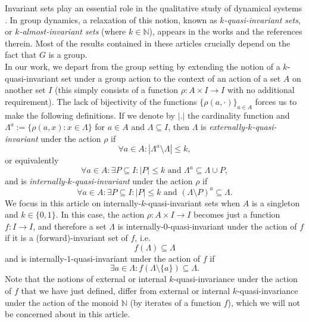 \documentclass[a4paper,11pt]{article}
\theoremstyle{plain}
\theoremstyle{definition}
\theoremstyle{remark}
\begin{document}
Invariant sets play an essential role in the qualitative study of dynamical systems \cite{KatokHasselblatt,BrinStuck}. In group dynamics, a relaxation of this notion, known as \textit{$k$-quasi-invariant sets}, or \textit{$k$-almost-invariant sets} (where $k \in \mathbb{N}$), appears in the works \cite{Brailovsky, Praeger, BrailovskyPasechenikPraeger, Kharazishvili, KimKim, AlaeiyanYoshiara, AlaeiyanRazzaghmanieshi} and the references therein. Most of the results contained in these articles crucially depend on the fact that $G$ is a group. \\
In our work, we depart from the group setting by extending the notion of a $k$-quasi-invariant set under a group action to the context of an action of a set $A$ on another set $I$ (this simply consists of a function $\rho : A \times I \to I$ with no additional requirement). The lack of bijectivity of the functions $\{\rho(a,\cdot)\}_{a \in A}$ forces us to make the following definitions. If we denote by $|.|$ the cardinality function and $\Lambda^a := \{\rho(a,x) : x \in \Lambda\}$ for $a \in A$ and $\Lambda \subseteq I$, then $\Lambda$ is \textit{externally-$k$-quasi-invariant} under the action $\rho$ if
\[ \forall a \in A : |\Lambda^a \setminus \Lambda| \leq k, \] 
or equivalently
\[ \forall a \in A : \exists P \subseteq I : |P| \leq k \text{ and } \Lambda^a \subseteq \Lambda \cup P, \] 
and is \textit{internally-$k$-quasi-invariant} under the action $\rho$ if
\[ \forall a \in A : \exists P \subseteq I : |P| \leq k \text{ and } (\Lambda \setminus P)^a \subseteq \Lambda. \] 
We focus in this article on internally-$k$-quasi-invariant sets when $A$ is a singleton and $k \in \{0,1\}$. In this case, the action $\rho : A \times I \to I$ becomes just a function $f : I \to I$, and therefore a set $\Lambda$ is internally-$0$-quasi-invariant under the action of $f$ if it is a (forward)-invariant set of $f$, i.e.
\begin{equation}
f(\Lambda) \subseteq \Lambda
\end{equation}
and is internally-$1$-quasi-invariant under the action of $f$ if
\begin{equation}	
\label{eq-1}
\exists a \in \Lambda : f(\Lambda \setminus \{a\}) \subseteq \Lambda.
\end{equation}
Note that the notions of external or internal $k$-quasi-invariance under the action of $f$ that we have just defined, differ from external or internal $k$-quasi-invariance under the action of the monoid $\mathbb{N}$ (by iterates of a function $f$), which we will not be concerned about in this article. \\ 
\end{document}
